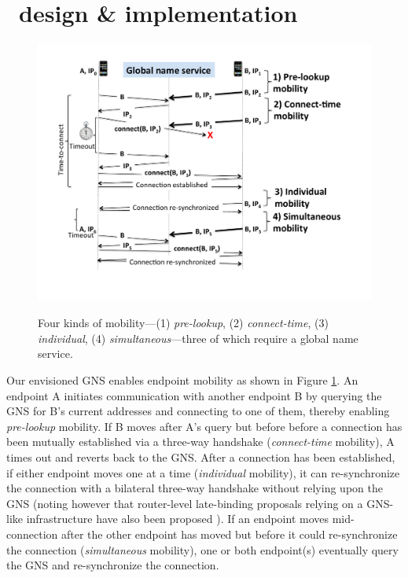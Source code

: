 \vsp
\section{ \auspice\ design \& implementation}
\label{sec:design}



\begin{figure}[htbp]
	\figvsp
	\begin{center}
		\includegraphics[scale=0.29]{figure/4mobility.pdf}
		\vspace{-0.3in}
		\caption{Four kinds of mobility---(1) {\em pre-lookup}, (2) {\em connect-time}, (3) {\em individual}, (4) {\em simultaneous}---three of which require a global name service.} 
		\vspace{-0.2in}
		\label{fig:4mobility}
	\end{center}
	\vsp
\end{figure}

{Our envisioned GNS enables endpoint mobility as shown in Figure \ref{fig:4mobility}. An endpoint A initiates communication with another endpoint B by querying the GNS for B's current addresses and connecting to one of them, thereby enabling {\em pre-lookup} mobility. If B moves after A's query but before before a connection has been mutually established via a three-way handshake ({\em connect-time} mobility), A times out and reverts back to the GNS. After a connection has been established, if either endpoint moves one at a time ({\em individual} mobility), it can re-synchronize the connection with a bilateral three-way handshake without relying upon the GNS (noting however that router-level late-binding proposals relying on a GNS-like infrastructure have also been proposed \cite{serval,MobilityFirst-UMASS}). If an endpoint moves mid-connection after the other endpoint has moved but before it could re-synchronize the connection ({\em simultaneous} mobility), one or both endpoint(s) eventually query the GNS and re-synchronize the connection.}



